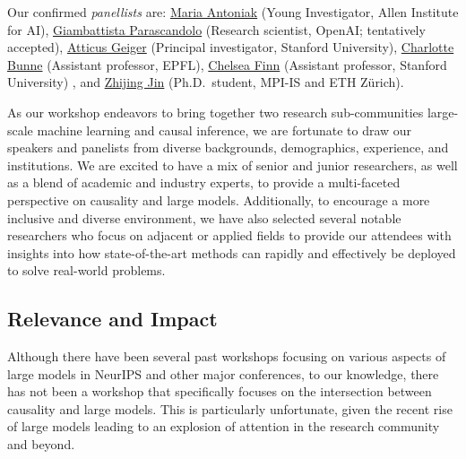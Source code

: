\documentclass{article}
\begin{document}
Our confirmed \textit{panellists} are:
\href{https://maria-antoniak.github.io/}{Maria Antoniak} (Young Investigator, Allen Institute for AI),
\href{https://sites.google.com/view/giambattista-parascandolo/home}{Giambattista Parascandolo} (Research scientist, OpenAI; tentatively accepted),
\href{https://atticusg.github.io/}{Atticus Geiger} (Principal investigator, Stanford University),
\href{https://www.bunnelab.com/}{Charlotte Bunne} (Assistant professor, EPFL),
\href{https://ai.stanford.edu/~cbfinn/}{Chelsea Finn} (Assistant professor, Stanford University) , and
\href{https://zhijing-jin.com/}{Zhijing Jin} (Ph.D.\ student, MPI-IS and ETH Zürich).


As our workshop endeavors to bring together two research sub-communities large-scale machine learning and causal inference, we are fortunate to draw our speakers and panelists from diverse backgrounds, demographics, experience, and institutions.
We are excited to have a mix of senior and junior researchers, as well as a blend of academic and industry experts, to provide a multi-faceted perspective on causality and large models.
Additionally, to encourage a more inclusive and diverse environment, we have also selected several notable researchers who focus on adjacent or applied fields to provide our attendees with insights into how state-of-the-art methods can rapidly and effectively be deployed to solve real-world problems.







\subsection{Relevance and Impact}

Although there have been several past workshops focusing on various aspects of large models in NeurIPS and other major conferences, to our knowledge, there has not been a workshop that specifically focuses on the intersection between causality and large models.
This is particularly unfortunate, given the recent rise of large models leading to an explosion of attention in the research community and beyond. 
\end{document}
